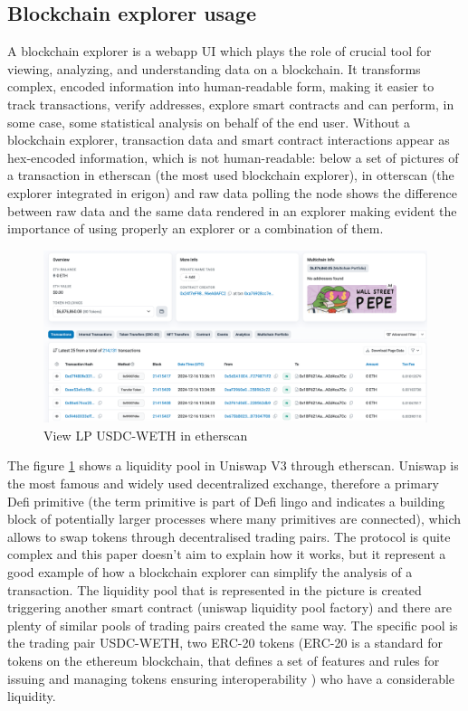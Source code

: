 \documentclass[11pt,a4paper,titlepage]{scrartcl}
\begin{document}
\subsection{Blockchain explorer usage}

A blockchain explorer is a webapp UI which plays the role of crucial tool for viewing, analyzing, and understanding data on a blockchain. It transforms complex, encoded information into human-readable form, making it easier to track transactions, verify addresses, explore smart contracts and can perform, in some case, some statistical analysis on behalf of the end user. Without a blockchain explorer, transaction data and smart contract interactions appear as hex-encoded information, which is not human-readable: below a set of pictures of a transaction in etherscan (the most used blockchain explorer), in otterscan (the explorer integrated in erigon) and raw data polling the node shows the difference between raw data and the same data rendered in an explorer making evident the importance of using properly an explorer or a combination of them.


\begin{figure}[ht]
    \includegraphics[width=1.0\textwidth]{image/explorers/uniswapLPetherscan.png}
    \caption{View LP USDC-WETH in etherscan}
    \label{fig:ethlp}
\end{figure}

The figure \ref{fig:ethlp} shows a liquidity pool in Uniswap V3 through etherscan.  Uniswap is the most famous and widely used decentralized exchange, therefore a primary Defi primitive (the term primitive is part of Defi lingo and indicates a building block of potentially larger processes where many primitives are connected),  which allows to swap tokens through decentralised trading pairs. The protocol is quite complex and this paper doesn't aim to explain how it works, but  it represent  a good example of how a blockchain explorer can simplify the analysis of a transaction. The liquidity pool that is represented in the picture is created triggering another smart contract (uniswap liquidity pool factory) and there are plenty of similar  pools of trading pairs created the same way. The specific pool  is the trading pair USDC-WETH, two ERC-20 tokens (ERC-20 is a standard for tokens on the ethereum blockchain, that defines a set of features and rules for issuing and managing tokens ensuring interoperability ) who have a considerable liquidity. 
\end{document}
